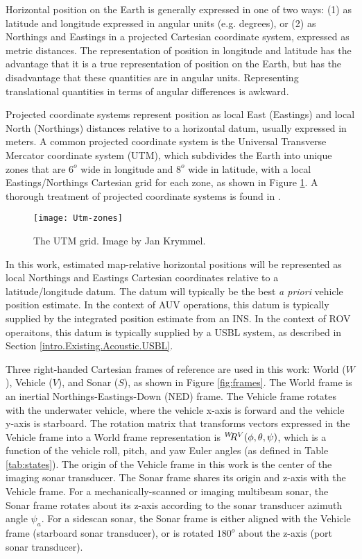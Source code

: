 Horizontal position on the Earth is generally expressed in one of two ways: (1) as latitude and longitude expressed in angular units (e.g. degrees), or (2) as Northings and Eastings in a projected Cartesian coordinate system, expressed as metric distances.
The representation of position in longitude and latitude has the advantage that it is a true representation of position on the Earth, but has the disadvantage that these quantities are in angular units.
Representing translational quantities in terms of angular differences is awkward.

Projected coordinate systems represent position as local East (Eastings) and local North (Northings) distances relative to a horizontal datum, usually expressed in meters. 
A common projected coordinate system is the Universal Transverse Mercator coordinate system (UTM), which subdivides the Earth into unique zones that are $6^{o}$ wide in longitude and $8^{o}$ wide in latitude, with a local Eastings/Northings Cartesian grid for each zone, as shown in Figure \ref{fig:UTM}.
A thorough treatment of projected coordinate systems is found in \cite{Chang2006}.

\begin{figure}[!h]
	\centering
		\texttt{[image: Utm-zones]}
	\caption{The UTM grid. Image by Jan Krymmel. }
	\label{fig:UTM}
\end{figure}

In this work, estimated map-relative horizontal positions will be represented as local Northings and Eastings Cartesian coordinates relative to a latitude/longitude datum.  
The datum will typically be the best \emph{a priori} vehicle position estimate.
In the context of AUV operations, this datum is typically supplied by the integrated position estimate from an INS.
In the context of ROV operaitons, this datum is typically supplied by a USBL system, as described in Section \ref{intro.Existing.Acoustic.USBL}.

Three right-handed Cartesian frames of reference are used in this work: World ($W$), Vehicle ($V$), and Sonar ($S$), as shown in Figure \ref{fig:frames}.
The World frame is an inertial Northings-Eastings-Down (NED) frame.
The Vehicle frame rotates with the underwater vehicle, where the vehicle x-axis is forward and the vehicle y-axis is starboard.
The rotation matrix that transforms vectors expressed in the Vehicle frame into a World frame representation is $^{W}\hspace{-0.8ex}R^{V}(\phi, \theta, \psi)$, which is a function of the vehicle roll, pitch, and yaw Euler angles (as defined in Table \ref{tab:states}).
The origin of the Vehicle frame in this work is the center of the imaging sonar transducer.
The Sonar frame shares its origin and z-axis with the Vehicle frame.
For a mechanically-scanned or imaging multibeam sonar, the Sonar frame rotates about its z-axis according to the sonar transducer azimuth angle $\psi_a$.
For a sidescan sonar, the Sonar frame is either aligned with the Vehicle frame (starboard sonar transducer), or is rotated $180^{o}$ about the z-axis (port sonar transducer).

